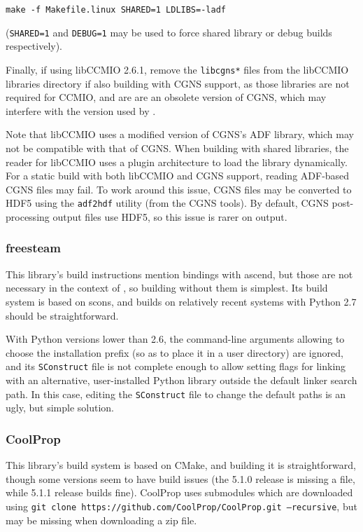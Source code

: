 \documentclass[a4paper,10pt,twoside]{csshortdoc}
\begin{document}
\texttt{make -f Makefile.linux SHARED=1 LDLIBS=-ladf}

(\texttt{SHARED=1} and \texttt{DEBUG=1} may be used to force
shared library or debug builds respectively).

Finally, if using libCCMIO 2.6.1, remove the \texttt{libcgns*}
files from the libCCMIO libraries directory if also building
\CS with CGNS support, as those libraries are not required
for CCMIO, and are are an obsolete version of CGNS, which
may interfere with the version used by \CS.

Note that libCCMIO uses a modified version of CGNS's ADF library,
which may not be compatible with that of CGNS. When building
with shared libraries, the reader for libCCMIO uses a plugin
architecture to load the library dynamically. For a static
build with both libCCMIO and CGNS support, reading ADF-based
CGNS files may fail. To work around this issue, CGNS files
may be converted to HDF5 using the \texttt{adf2hdf} utility
(from the CGNS tools). By default, CGNS post-processing output
files use HDF5, so this issue is rarer on output.

\subsubsection{freesteam\label{sec:ext:freesteam}}

This library's build instructions mention bindings with ascend,
but those are not necessary in the context of \CS, so building
without them is simplest. Its build system is based on scons,
and builds on relatively recent systems with Python 2.7 should
be straightforward.

With Python versions lower than 2.6, the command-line arguments
allowing to choose the installation prefix (so as to place it
in a user directory) are ignored, and its \texttt{SConstruct}
file is not complete enough to allow setting flags for linking
with an alternative, user-installed Python library outside
the default linker search path. In this case, editing the
\texttt{SConstruct} file to change the default paths is
an ugly, but simple solution.

\subsubsection{CoolProp\label{sec:ext:coolprop}}

This library's build system is based on CMake, and building it
is straightforward, though some versions seem to have build
issues (the 5.1.0 release is missing a file, while 5.1.1 release
builds fine). CoolProp uses submodules which are downloaded
using \texttt{git clone https://github.com/CoolProp/CoolProp.git --recursive},
but may be missing when downloading a zip file.
\end{document}

